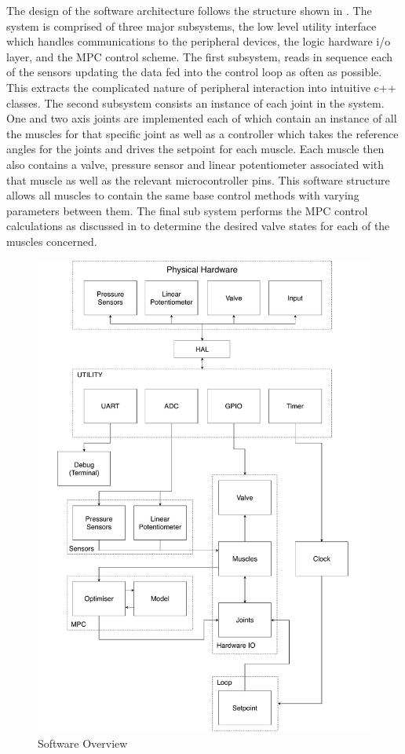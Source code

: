 \documentclass[11pt,a4paper]{article}
\begin{document}
The design of the software architecture follows the structure shown in . The system is comprised of three major subsystems, the low level utility interface which handles communications to the peripheral devices, the logic hardware i/o layer, and the MPC control scheme. The first subsystem, reads in sequence each of the sensors updating the data fed into the control loop as often as possible. This extracts the complicated nature of peripheral interaction into intuitive c++ classes. The second subsystem consists an instance of each joint in the system. One and two axis joints are implemented each of which contain an instance of all the muscles for that specific joint as well as a controller which takes the reference angles for the joints and drives the setpoint for each muscle. Each muscle then also contains a valve, pressure sensor and linear potentiometer associated with that muscle as well as the relevant microcontroller pins. This software structure allows all muscles to contain the same base control methods with varying parameters between them. The final sub system performs the MPC control calculations as discussed in  to determine the desired valve states for each of the muscles concerned.

\begin{figure}[!hbt]
    \centering
    \includegraphics[clip, trim=0cm 0cm 0cm 0cm, width=1.00\textwidth]{Software.pdf}
    \caption{Software Overview}
    \label{fig:software_arch}
\end{figure}
\end{document}
